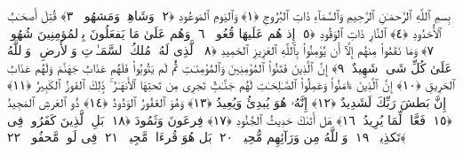 
  
    
  
    
    

\nopagebreak
  بِسمِ ٱللَّهِ ٱلرَّحمَـٰنِ ٱلرَّحِيمِ
  وَٱلسَّمَآءِ ذَاتِ ٱلبُرُوجِ ﴿١﴾
 وَٱليَومِ ٱلمَوعُودِ ﴿٢﴾
 وَشَاهِدٍۢ وَمَشهُودٍۢ ﴿٣﴾
 قُتِلَ أَصحَـٰبُ ٱلأُخدُودِ ﴿٤﴾
 ٱلنَّارِ ذَاتِ ٱلوَقُودِ ﴿٥﴾
 إِذ هُم عَلَيهَا قُعُودٌۭ ﴿٦﴾
 وَهُم عَلَىٰ مَا يَفعَلُونَ بِٱلمُؤمِنِينَ شُهُودٌۭ ﴿٧﴾
 وَمَا نَقَمُوا۟ مِنهُم إِلَّآ أَن يُؤمِنُوا۟ بِٱللَّهِ ٱلعَزِيزِ ٱلحَمِيدِ ﴿٨﴾
 ٱلَّذِى لَهُۥ مُلكُ ٱلسَّمَـٰوَٟتِ وَٱلأَرضِ ۚ وَٱللَّهُ عَلَىٰ كُلِّ شَىءٍۢ شَهِيدٌ ﴿٩﴾
 إِنَّ ٱلَّذِينَ فَتَنُوا۟ ٱلمُؤمِنِينَ وَٱلمُؤمِنَـٰتِ ثُمَّ لَم يَتُوبُوا۟ فَلَهُم عَذَابُ جَهَنَّمَ وَلَهُم عَذَابُ ٱلحَرِيقِ ﴿١٠﴾
 إِنَّ ٱلَّذِينَ ءَامَنُوا۟ وَعَمِلُوا۟ ٱلصَّـٰلِحَـٰتِ لَهُم جَنَّـٰتٌۭ تَجرِى مِن تَحتِهَا ٱلأَنهَـٰرُ ۚ ذَٟلِكَ ٱلفَوزُ ٱلكَبِيرُ ﴿١١﴾
 إِنَّ بَطشَ رَبِّكَ لَشَدِيدٌ ﴿١٢﴾
 إِنَّهُۥ هُوَ يُبدِئُ وَيُعِيدُ ﴿١٣﴾
 وَهُوَ ٱلغَفُورُ ٱلوَدُودُ ﴿١٤﴾
 ذُو ٱلعَرشِ ٱلمَجِيدُ ﴿١٥﴾
 فَعَّالٌۭ لِّمَا يُرِيدُ ﴿١٦﴾
 هَل أَتَىٰكَ حَدِيثُ ٱلجُنُودِ ﴿١٧﴾
 فِرعَونَ وَثَمُودَ ﴿١٨﴾
 بَلِ ٱلَّذِينَ كَفَرُوا۟ فِى تَكذِيبٍۢ ﴿١٩﴾
 وَٱللَّهُ مِن وَرَآئِهِم مُّحِيطٌۢ ﴿٢٠﴾
 بَل هُوَ قُرءَانٌۭ مَّجِيدٌۭ ﴿٢١﴾
 فِى لَوحٍۢ مَّحفُوظٍۭ ﴿٢٢﴾
 
